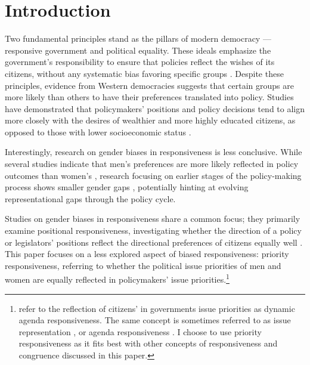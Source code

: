 

\section*{Introduction}
Two fundamental principles stand as the pillars of modern democracy — responsive government and political equality. These ideals emphasize the government's responsibility to ensure that policies reflect the wishes of its citizens, without any systematic bias favoring specific groups \parencite{dahl_polyarchy_1971}. Despite these principles, evidence from Western democracies suggests that certain groups are more likely than others to have their preferences translated into policy. Studies have demonstrated that policymakers' positions and policy decisions tend to align more closely with the desires of wealthier and more highly educated citizens, as opposed to those with lower socioeconomic status \parencite{gilens_affluence_2012, bartels_unequal_2008, schakel_real_2020, schakel_degrees_2021, mathisen_affluence_2023}.

Interestingly, research on gender biases in responsiveness is less conclusive. While several studies indicate that men's preferences are more likely reflected in policy outcomes than women's \parencite{persson_mans_2023,reher_gender_2018,mathisen_influence_2024,kopkin_gender_2023}, research focusing on earlier stages of the policy-making process shows smaller gender gaps \parencite{ferland_gender_2020,bernauer_mind_2015,dingler_parliaments_2019, homola_are_2019}, potentially hinting at evolving representational gaps through the policy cycle.

Studies on gender biases in responsiveness share a common focus; they primarily examine positional responsiveness, investigating whether the direction of a policy or legislators' positions reflect the directional preferences of citizens equally well \parencite{persson_mans_2023,reher_gender_2018,mathisen_influence_2024,kopkin_gender_2023,ferland_gender_2020, bernauer_mind_2015,homola_are_2019, dingler_parliaments_2019}. This paper focuses on a less explored aspect of biased responsiveness: priority responsiveness, referring to whether the political issue priorities of men and women are equally reflected in policymakers' issue priorities.\footnote{\textcite{bevan_representation_2014} refer to the reflection of citizens' in governments issue priorities as dynamic agenda responsiveness. The same concept is sometimes referred to as issue representation \parencite{dennison_explaining_2023, kluver_setting_2016}, or agenda responsiveness \parencite{traber_social_2022,alexandrova_agenda_2016}. I choose to use priority responsiveness \parencite{reher_gender_2018} as it fits best with other concepts of responsiveness and congruence discussed in this paper.}

